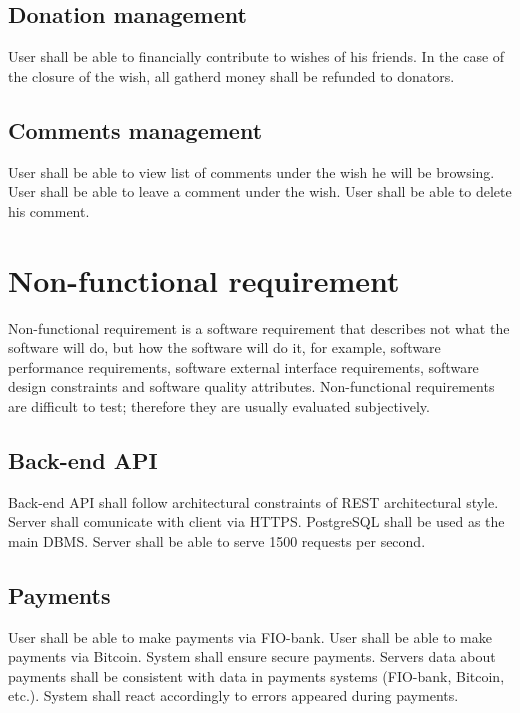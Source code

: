 \subsection{Donation management}
User shall be able to financially contribute to wishes of his friends.
In the case of the closure of the wish, all gatherd money shall be refunded to donators.

\subsection{Comments management}
User shall be able to view list of comments under the wish he will be browsing.
User shall be able to leave a comment under the wish.
User shall be able to delete his comment.

\section{Non-functional requirement}
Non-functional requirement is a software requirement that describes not what the software will do, but how the software
will do it, for example, software performance requirements, software external interface requirements, software design
constraints and software quality attributes. Non-functional requirements are difficult to test; therefore they are
usually evaluated subjectively.\cite{nonfuncreq}

\subsection{Back-end \ac{API}}
Back-end API shall follow architectural constraints of REST architectural style.
Server shall comunicate with client via \ac{HTTPS}.
PostgreSQL shall be used as the main DBMS.
Server shall be able to serve 1500 requests per second.

\subsection{Payments}
User shall be able to make payments via FIO-bank.
User shall be able to make payments via Bitcoin.
System shall ensure secure payments.
Servers data about payments shall be consistent with data in payments systems (FIO-bank, Bitcoin, etc.).
System shall react accordingly to errors appeared during payments.



